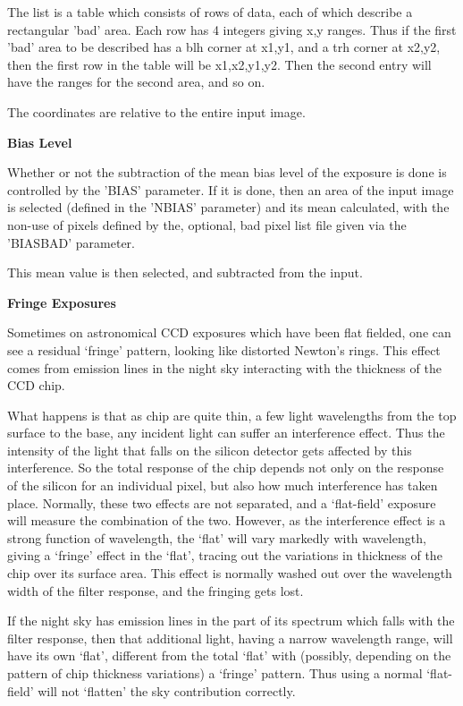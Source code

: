 \begin{small}
{{  The list is a table which consists of rows of data, each of
  which describe a rectangular 'bad' area. Each row has 4 integers
  giving x,y ranges. Thus if the first 'bad' area to be described has a
  blh corner at x1,y1, and a trh corner at x2,y2, then the first row
  in the table will be x1,x2,y1,y2. Then the second entry will have
  the ranges for the second area, and so on.
 
  The coordinates are relative to the entire input image.
 
{\hspace*{4ex} \bf  Bias Level}
 
  Whether or not the subtraction of the mean bias level of the exposure
  is done is controlled by the 'BIAS' parameter. If it is done, then an
  area of the input image is selected (defined in the 'NBIAS'
  parameter) and its mean calculated, with the non-use of pixels
  defined by the, optional, bad pixel list file given via the
  'BIASBAD' parameter.
 
  This mean value is then selected, and subtracted from the input.
 
{\hspace*{4ex} \bf  Fringe Exposures}
 
 Sometimes on astronomical CCD exposures which have been flat fielded,
 one can see a residual `fringe' pattern, looking like distorted
 Newton's rings. This effect comes from emission lines in the night
 sky interacting with the thickness of the CCD chip.
 
 What happens is that as chip are quite thin, a few light wavelengths
 from the top surface to the base, any incident light can suffer an
 interference effect. Thus the intensity of the light that falls on
 the silicon detector gets affected by this interference. So the total
 response of the chip depends not only on the response of the silicon
 for an individual pixel, but also how much interference has taken
 place. Normally, these two effects are not separated, and a `flat-field'
 exposure will measure the combination of the two. However, as the
 interference effect is a strong function of wavelength, the `flat'
 will vary markedly with wavelength, giving a `fringe' effect in the
 `flat', tracing out the variations in thickness of the chip over its
 surface area. This effect is normally washed out over the wavelength
 width of the filter response, and the fringing gets lost.
 
 If the night sky has emission lines in the part of its spectrum which
 falls with the filter response, then that additional light, having
 a narrow wavelength range, will have its own `flat', different from
 the total `flat' with (possibly, depending on the pattern of chip
 thickness variations) a `fringe' pattern. Thus using a normal
 `flat-field' will not `flatten' the sky contribution correctly.
 
}}
\end{small}
